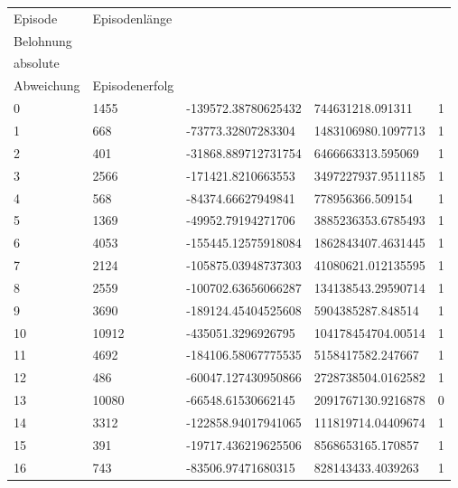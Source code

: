 \begin{longtable}{lllll}
    Episode & Episodenlänge & \begin{tabular}[c]{@{}l@{}}kumulierte \\ Belohnung\end{tabular} & \begin{tabular}[c]{@{}l@{}}quadrierte \\ absolute \\ Abweichung\end{tabular} & Episodenerfolg \\
    \endhead
    0 & 1455 & -139572.38780625432 & 744631218.091311 & 1 \\
    1 & 668 & -73773.32807283304 & 1483106980.1097713 & 1 \\
    2 & 401 & -31868.889712731754 & 6466663313.595069 & 1 \\
    3 & 2566 & -171421.8210663553 & 3497227937.9511185 & 1 \\
    4 & 568 & -84374.66627949841 & 778956366.509154 & 1 \\
    5 & 1369 & -49952.79194271706 & 3885236353.6785493 & 1 \\
    6 & 4053 & -155445.12575918084 & 1862843407.4631445 & 1 \\
    7 & 2124 & -105875.03948737303 & 41080621.012135595 & 1 \\
    8 & 2559 & -100702.63656066287 & 134138543.29590714 & 1 \\
    9 & 3690 & -189124.45404525608 & 5904385287.848514 & 1 \\
    10 & 10912 & -435051.3296926795 & 104178454704.00514 & 1 \\
    11 & 4692 & -184106.58067775535 & 5158417582.247667 & 1 \\
    12 & 486 & -60047.127430950866 & 2728738504.0162582 & 1 \\
    13 & 10080 & -66548.61530662145 & 2091767130.9216878 & 0 \\
    14 & 3312 & -122858.94017941065 & 111819714.04409674 & 1 \\
    15 & 391 & -19717.436219625506 & 8568653165.170857 & 1 \\
    16 & 743 & -83506.97471680315 & 828143433.4039263 & 1 \\

\end{longtable}
